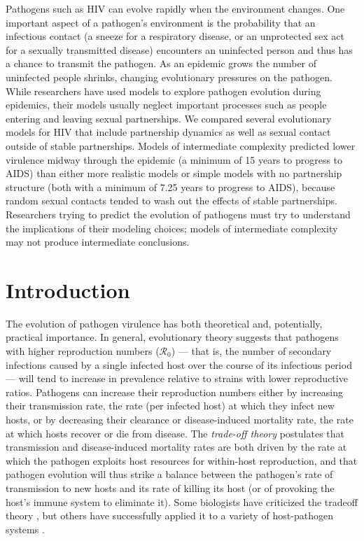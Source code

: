 \documentclass[10pt,letterpaper]{article}
\newcommand{\rzero}{{\mathcal R}_0}
\begin{document}

Pathogens such as HIV can evolve rapidly when the environment changes.
One important aspect of a pathogen's environment is the probability that an infectious
contact (a sneeze for a respiratory disease, or an unprotected
sex act for a sexually transmitted disease) encounters an uninfected
person and thus has a chance to transmit the
pathogen. As an epidemic grows the number of
uninfected people shrinks, changing
evolutionary pressures on the pathogen.
While researchers have used models to explore
pathogen evolution during epidemics, their models usually neglect
important processes such as people entering and leaving sexual
partnerships. We compared several evolutionary models for HIV that include
partnership dynamics as well as sexual contact outside of stable
partnerships. Models of intermediate complexity predicted lower
virulence midway through the epidemic
(a minimum of 15 years to
progress to AIDS) than either more realistic models
or simple models with no partnership structure
(both with a minimum of 7.25 years to progress to AIDS), 
because random sexual contacts tended to wash out the effects of stable partnerships.
Researchers trying to predict the evolution of
pathogens must try to understand the implications of their
modeling choices; models of intermediate complexity may not
produce intermediate conclusions.

\linenumbers

\section*{Introduction}

The evolution of pathogen virulence has both 
theoretical and, potentially, practical
importance. In general, evolutionary theory suggests that
pathogens with higher reproduction numbers ($\rzero$) --- that is, the number of secondary infections caused by a single infected host over the course of its infectious period --- will tend to increase in prevalence relative to strains with lower reproductive ratios.
Pathogens can increase their reproduction numbers either
by increasing their transmission rate, 
the rate (per infected host) at which they
infect new hosts, or by decreasing their clearance or disease-induced
mortality rate, the rate
at which hosts recover or die from disease.
The \emph{trade-off theory} \cite{alizon_virulence_2009} postulates that
transmission and disease-induced mortality rates are both driven by the rate at which
the pathogen exploits host resources for within-host reproduction, 
and that pathogen
evolution will thus strike a balance between the
pathogen's rate of transmission
to new hosts and its rate of killing its host (or of provoking
the host's immune system to eliminate it).
Some biologists have criticized the tradeoff theory
\cite{EbertBull2003,alizon_adaptive_2015}, but others have
successfully applied it to a variety of host-pathogen systems \cite{Dwyer+1990,mackinnon1999genetic,jensen2006empirical,deroode2008virulence}.
\end{document}
